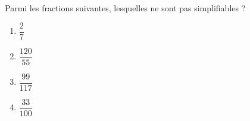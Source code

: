 
\begin{exercice}\label{exo2smath-0000}

    Parmi les fractions suivantes, lesquelles ne sont pas simplifiables ?
    \begin{multicols}{4}
        \begin{enumerate}
            \item
                \( \dfrac{ 2 }{ 7 }\)
            \item
                \( \dfrac{ 120 }{ 55 }\)
            \item
                \( \dfrac{ 99 }{ 117 }\)
            \item
                \( \dfrac{ 33 }{ 100 }\)
        \end{enumerate}
    \end{multicols}

\end{exercice}
